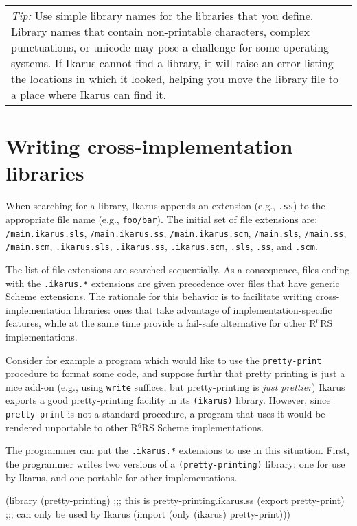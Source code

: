 \documentclass[onecolumn, 12pt, twoside, openright, dvipdfm]{book}
\newcommand{\rnrs}[1]{R$^{\mathrm{#1}}$RS}
\newcommand{\BoxedText}[2]{
  \vspace{.05in}
  \begin{center}
    \begin{tabular}{|p{4.6in}|} {\large \emph{#1}} #2 \end{tabular}
  \end{center}
  \vspace{.05in}
}
\begin{document}
\BoxedText{Tip:}{Use simple library names for the libraries that
you define.  Library names that contain non-printable characters,
complex punctuations, or unicode may pose a challenge for some
operating systems.  If Ikarus cannot find a library, it will raise
an error listing the locations in which it looked, helping you move
the library file to a place where Ikarus can find it.}

\section{Writing cross-implementation libraries}

When searching for a library, Ikarus appends an extension (e.g.,
\verb|.ss|) to the appropriate file name (e.g., \verb|foo/bar|).
The initial set of file extensions are: \\
\verb|/main.ikarus.sls|,
\verb|/main.ikarus.ss|, \verb|/main.ikarus.scm|,
\verb|/main.sls|, \verb|/main.ss|, \verb|/main.scm|,
\verb|.ikarus.sls|,
\verb|.ikarus.ss|, \verb|.ikarus.scm|,
\verb|.sls|, \verb|.ss|, and \verb|.scm|.

The list of file extensions are searched sequentially.  As a
consequence, files ending with the \verb|.ikarus.*| extensions are
given precedence over files that have generic Scheme extensions.
The rationale for this behavior is to facilitate writing
cross-implementation libraries: ones that take advantage of
implementation-specific features, while at the same time 
provide a fail-safe alternative for other \rnrs{6}
implementations.

Consider for example a program which would like to use the
\verb|pretty-print| procedure to format some code, and suppose
furthr that pretty printing is just a nice add-on (e.g., using
\verb|write| suffices, but pretty-printing is \emph{just prettier})
Ikarus exports a good pretty-printing facility in its
\verb|(ikarus)| library.  However, since \verb|pretty-print| is not
a standard procedure, a program that uses it would be rendered
unportable to other \rnrs{6} Scheme implementations.  

The programmer can put the \verb|.ikarus.*| extensions to use in
this situation.  First, the programmer writes two versions of a
\verb|(pretty-printing)| library: one for use by Ikarus, and one
portable for other implementations.

\begin{CodeInline}
(library (pretty-printing) ;;; this is pretty-printing.ikarus.ss
  (export pretty-print)    ;;; can only be used by Ikarus
  (import (only (ikarus) pretty-print)))
\end{CodeInline}
\end{document}
